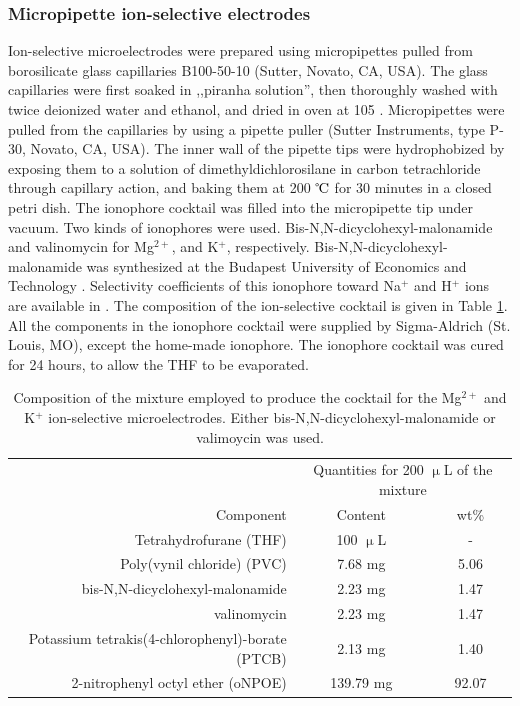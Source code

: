 	\subsubsection{Micropipette ion-selective electrodes}
Ion-selective microelectrodes were prepared using micropipettes pulled from bo\-ro\-si\-li\-cate glass capillaries B100-50-10 (Sutter, Novato, CA, USA).
The glass capillaries were first soaked in ,,piranha solution'', then thoroughly washed with twice deionized water and ethanol, and dried in oven at 105 \celsius.
Micropipettes were pulled from the capillaries by using a pipette puller (Sutter Instruments, type P-30, Novato, CA, USA).
The inner wall of the pipette tips were hydrophobized by exposing them to a solution of dimethyldichlorosilane in carbon tetrachloride through capillary action, and baking them at 200 $\celsius $ for 30 minutes in a closed petri dish.
The ionophore cocktail was filled into the micropipette tip under vacuum.
Two kinds of ionophores were used.
Bis-N,N-dicyclohexyl-malonamide and valinomycin for Mg$^{2+}$, and K$^+$, respectively.
Bis-N,N-dicyclohexyl-malonamide was synthesized at the Budapest University of Economics and Technology \cite{toth1993analytical}.
Selectivity coefficients of this ionophore toward Na$^+$ and H$^+$ ions are available in \cite{toth1993analytical}.
The composition of the ion-selective cocktail is given in Table \ref{table:cocktail}.
All the components in the ionophore cocktail were supplied by Sigma-Aldrich (St. Louis, MO), except the home-made ionophore.
The ionophore cocktail was cured for 24 hours, to allow the THF to be evaporated.
				
\begin{table}
                \caption[Composition of the mixture employed to produce the cocktail for the Mg$^{2+}$ and K$^+$ ion-selective microelectrodes.]{Composition of the mixture employed to produce the cocktail for the Mg$^{2+}$ and K$^+$ ion-selective microelectrodes.
Either bis-N,N-dicyclohexyl-malonamide or valimoycin was used.}
                \label{table:cocktail}
                \centering
                \begin{tabular}{r c c}
			& \multicolumn{2}{c}{Quantities for 200 $\upmu$L of the mixture}\\
			\cline{2-3}
                        Component & Content & wt\% \\
                        \hline
                        Tetrahydrofurane (THF) & 100 $\upmu$L & - \\
                        Poly(vynil chloride) (PVC) & 7.68 mg & 5.06 \\
                        bis-N,N-dicyclohexyl-malonamide & 2.23 mg & 1.47 \\
			valinomycin & 2.23 mg & 1.47 \\
                        Potassium tetrakis(4-chlorophenyl)-borate (PTCB) & 2.13 mg & 1.40 \\
			2-nitrophenyl octyl ether (oNPOE) & 139.79 mg & 92.07 \\
                \end{tabular}
\end{table}

